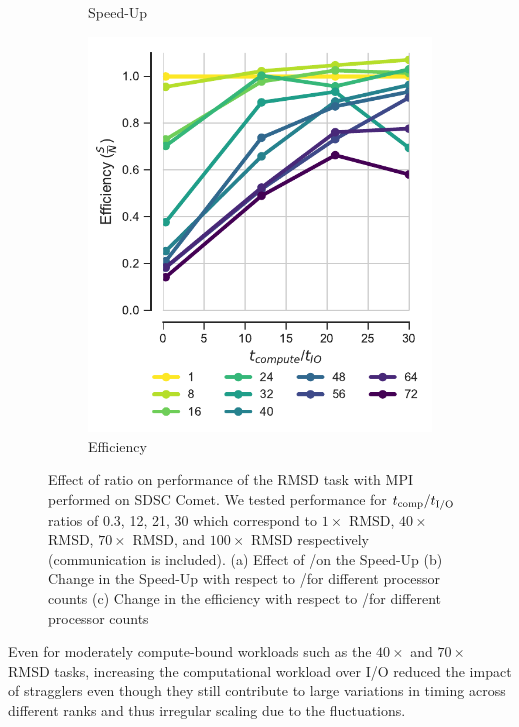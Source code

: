 \begin{figure}[ht!]
\begin{subfigure}{.3\textwidth}
  \caption{Speed-Up}
  \label{fig:S2_tcomp_tIO_effect}
\end{subfigure}
\hfill
\begin{subfigure}{.3\textwidth}
  \includegraphics[width=\linewidth]{figures/Compute_to_IO_ratio_on_performance_2d_3_v17.pdf}
  \caption{Efficiency}
  \label{fig:E_tcomp_tIO_effect}
\end{subfigure}
%
\caption{Effect of \text{$\tcomp/\tIO$} ratio on performance of the RMSD task with MPI performed on SDSC Comet. We tested performance for $\tcomp/\tIO$ ratios of 0.3, 12, 21, 30
which correspond to $1\times$ RMSD, $40\times$ RMSD, $70\times$ RMSD, and $100\times$ RMSD respectively (communication is included). (a) Effect of \tcomp/\tIO on the Speed-Up
(b) Change in the Speed-Up with respect to \tcomp/\tIO for different processor counts (c) Change in the efficiency with respect to \tcomp/\tIO for different processor counts}
\label{fig:tcomp_tIO_effect}
\end{figure}

Even for moderately compute-bound workloads such
as the $40\times$ and $70\times$ RMSD tasks, increasing the computational workload over I/O reduced the impact of stragglers even
though they still contribute to large variations in timing across different ranks and thus irregular scaling due to the fluctuations.

